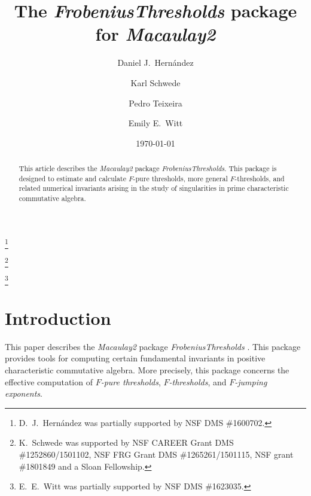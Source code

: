 \documentclass{amsart}
\begin{document}
\title[]{The \emph{FrobeniusThresholds} package for \emph{Macaulay2}}

\author[]{Daniel J.\ Hern\'andez}
\address{Department of Mathematics, University of Kansas, Lawrence, KS~66045, USA}
\thanks{D.~J.~Hern\'andez was partially supported by NSF DMS \#1600702.}



\author[]{Karl Schwede}
\address{Department of Mathematics, University of Utah, Salt Lake City, UT~84112, USA}
\thanks{K.~Schwede was supported by NSF CAREER Grant DMS \#1252860/1501102, NSF FRG Grant DMS \#1265261/1501115, NSF grant \#1801849 and a Sloan Fellowship.}

\author[]{Pedro Teixeira}
\address{Department of Mathematics, Knox College, Galesburg, IL~61401, USA}

\author[]{Emily E.\ Witt}
\address{Department of Mathematics, University of Kansas, Lawrence, KS~66045, USA}
\thanks{E.~E.~Witt was partially supported by NSF DMS \#1623035.}
\date{\today}

\begin{abstract}
   This article describes the \emph{Macaulay2} package \emph{FrobeniusThresholds}.
   This package is designed to estimate and calculate $F$-pure thresholds, more general $F$-thresholds, and related numerical invariants arising in the study of singularities in prime characteristic commutative algebra.
\end{abstract}



\maketitle

\section{Introduction}

This paper describes the \emph{Macaulay2} package \emph{FrobeniusThresholds} \cite{M2, FThresholdsPackage}.  This package provides tools for computing certain fundamental invariants in positive characteristic commutative algebra.  More precisely, this package concerns the effective computation of \emph{$F$-pure thresholds}, \emph{$F$-thresholds}, and \emph{$F$-jumping exponents}.
\end{document}
